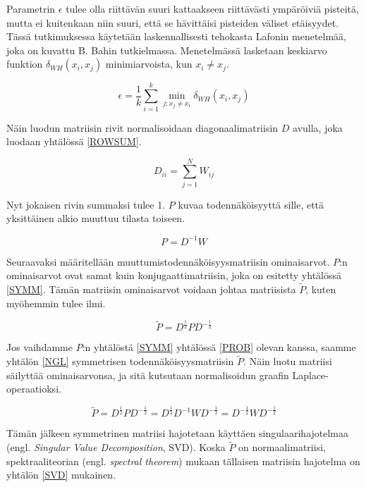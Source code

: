 Parametrin $\epsilon$ tulee olla riittävän suuri kattaakseen
riittävästi ympäröiviä pisteitä, mutta ei kuitenkaan niin suuri, että
se hävittäisi pisteiden väliset etäisyydet. Tässä tutkimuksessa
käytetään laskennallisesti tehokasta Lafonin menetelmää, joka on
kuvattu B. Bahin tutkielmassa\cite{bah}. %
Menetelmässä lasketaan keskiarvo funktion $\delta_{WH}(x_i,x_j)$ minimiarvoista, kun $x_i \ne x_j$. 

\begin{equation*}
\epsilon = \frac{1}{k} \sum_{i=1}^k \min_{j:x_j \ne x_i} \delta_{WH}(x_i, x_j)
\label{EPSILON}
\end{equation*}

\noindent Näin luodun matriisin rivit normalisoidaan diagonaalimatriisin $D$ avulla, joka luodaan yhtälössä \ref{ROWSUM}. 

\begin{equation}
D_{ii} = \sum_{j=1}^{N} W_{ij}
\label{ROWSUM}
\end{equation}

\noindent Nyt jokaisen rivin summaksi tulee 1. $P$ kuvaa todennäköisyyttä sille, että yksittäinen alkio muuttuu tilasta toiseen.

\begin{equation}
P = D^{-1} W
\label{PROB}
\end{equation}

\noindent Seuraavaksi määritellään muuttumistodennäköisyysmatriisin ominaisarvot. $P$:n ominaisarvot ovat samat kuin konjugaattimatriisin, joka on esitetty yhtälössä \ref{SYMM}. Tämän matriisin ominaisarvot voidaan johtaa matriisista $\tilde{P}$, kuten myöhemmin tulee ilmi.

\begin{equation}
\tilde{P} = D^{\frac{1}{2}} P D^{-\frac{1}{2}}
\label{SYMM}
\end{equation}

\noindent Jos vaihdamme $P$:n yhtälöstä \ref{SYMM} yhtälössä \ref{PROB} olevan kanssa, saamme yhtälön \ref{NGL} symmetrisen todennäköisyysmatriisin $\tilde{P}$. Näin luotu matriisi säilyttää ominaisarvonsa, ja sitä kutsutaan normalisoidun graafin Laplace-operaatioksi.

\begin{equation}
\tilde{P} = D^{\frac{1}{2}} P D^{-\frac{1}{2}} = D^{\frac{1}{2}} D^{-1} W D^{-\frac{1}{2}} = D^{-\frac{1}{2}} W D^{-\frac{1}{2}}
\label{NGL}
\end{equation}

\noindent Tämän jälkeen symmetrinen matriisi hajotetaan käyttäen singulaarihajotelmaa (engl. \textit{Singular Value Decomposition}, SVD). Koska $\tilde{P}$ on normaalimatriisi, spektraaliteorian (engl. \textit{spectral theorem}) mukaan tällaisen matriisin 
hajotelma on yhtälön \ref{SVD} mukainen.  


